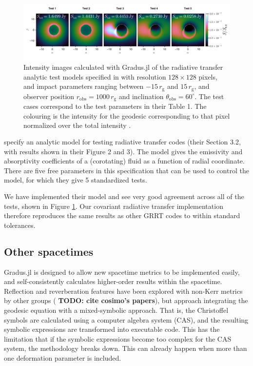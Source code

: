 \documentclass[fleqn,usenatbib]{mnras}
\newcommand{\todo}[1]{{\noindent \bf \color{red} TODO: #1}}
\newcommand{\Gradus}{Gradus.jl }
\newcommand{\rg}{r_\text{g}}
\begin{document}
\begin{figure}
	\centering
	\includegraphics[width=0.99\linewidth]{figures/radiative-transfer.gold.pdf}
	\caption{Intensity images calculated with \Gradus of the radiative transfer analytic test models specified in \citet{gold_verification_2020} with resolution $128 \times 128$ pixels, and impact parameters ranging between $-15\, \rg$ and $15\, \rg$, and observer position $r_\text{obs} = 1000\, \rg$ and inclination $\theta_\text{obs} = 60^\circ$. The test cases correspond to the test parameters in their Table 1. The colouring is the intensity for the geodesic corresponding to that pixel normalized over the total intensity .}
	\label{fig:gold-test-problems}
\end{figure}

\cite{gold_verification_2020} specify an analytic model for testing radiative
transfer codes (their Section 3.2, with results shown in their Figure 2 and 3).
The model gives the emissivity and absorptivity coefficients of a (corotating)
fluid as a function of radial coordinate. There are five free parameters in this
specification that can be used to control the model, for which they give 5
standardized tests.

We have implemented their model and see very good agreement across all of the
tests, shown in Figure \ref{fig:gold-test-problems}. Our covariant radiative
transfer implementation therefore reproduces the same results as other GRRT
codes to within standard tolerances.

\subsection{Other spacetimes}

\Gradus is designed to allow new spacetime metrics to be implemented easily, and
self-consistently calculates higher-order results within the spacetime.
Reflection and reverberation features have been explored with non-Kerr metrics
by other groups (\todo{cite cosimo's papers}), but approach integrating the
geodesic equation with a mixed-symbolic approach. That is, the Christoffel
symbols are calculated using a computer algebra system (CAS), and the resulting
symbolic expressions are transformed into executable code. This has the
limitation that if the symbolic expressions become too complex for the CAS
system, the methodology breaks down. This can already happen when more than one
deformation parameter is included.
\end{document}
